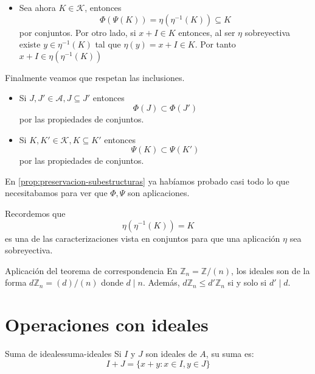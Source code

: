 \begin{proofbox}
\begin{itemize}
        \item Sea ahora $K \in \mathcal{K}$, entonces 
        \[
        \Phi(\Psi(K)) = \eta(\eta^{-1}(K)) \subseteq K
        \]
        por conjuntos. Por otro lado, si $x + I \in K$ entonces, al ser $\eta$ sobreyectiva existe $y \in \eta^{-1}(K)$ tal que $\eta(y) = x + I \in K$. Por tanto $x + I \in \eta(\eta^{-1}(K))$ 
    \end{itemize}

    Finalmente veamos que respetan las inclusiones.
    \begin{itemize}
        \item Si $J,J' \in \mathcal{A}, J \subseteq J'$ entonces
        \[
        \Phi(J) \subset \Phi(J')
        \]
        por las propiedades de conjuntos.
        \item Si $K, K' \in \mathcal{K}, K \subseteq K'$ entonces
        \[
        \Psi(K) \subset \Psi(K')
        \]
        por las propiedades de conjuntos.
    \end{itemize}
\end{proofbox}

\begin{remark}
    En \ref{prop:preservacion-subestructuras} ya habíamos probado casi todo lo que necesitabamos para ver que $\Phi, \Psi$ son aplicaciones.
\end{remark}

\begin{remark}
    Recordemos que
    \[
    \eta(\eta^{-1}(K)) = K
    \]
    es una de las caracterizaciones vista en conjuntos para que una aplicación $\eta$ sea sobreyectiva.
\end{remark}

\begin{example}{Aplicación del teorema de correspondencia}{}
    En \(\mathbb{Z}_n = \mathbb{Z}/(n)\), los ideales son de la forma \(d\mathbb{Z}_n = (d)/(n)\) donde \(d \mid n\). Además, \(d\mathbb{Z}_n \leq d'\mathbb{Z}_n\) si y solo si \(d' \mid d\).
\end{example}

\clearpage

\section{Operaciones con ideales}

\begin{definition}{Suma de ideales}{suma-ideales}
    Si \(I\) y \(J\) son ideales de \(A\), su {suma} es:
    \[
    I + J = \{x + y : x \in I, y \in J\}
    \]
\end{definition}

